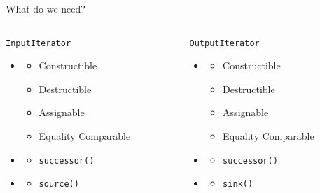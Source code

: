 \documentclass[aspectratio=169]{beamer}
\begin{document}

\begin{frame}{What do we need?}
  \begin{columns}
    \begin{column}{0.5\textwidth}
      \centerline{\texttt{InputIterator}}
      \begin{itemize}
      \item[] 
        \begin{itemize}
        \item Constructible
        \item Destructible
        \item Assignable
        \item Equality Comparable
        \end{itemize}
      \item[] 
        \begin{itemize}
        \item \texttt{successor()}
        \end{itemize}
      \item[] 
        \begin{itemize}
        \item \texttt{source()}
        \end{itemize}
      \end{itemize}
    \end{column}

    \begin{column}{0.5\textwidth}
      \centerline{\texttt{OutputIterator}}
      \begin{itemize}
      \item[] 
        \begin{itemize}
        \item Constructible
        \item Destructible
        \item Assignable
        \item Equality Comparable
        \end{itemize}
      \item[] 
        \begin{itemize}
        \item \texttt{successor()}
        \end{itemize}
      \item[] 
        \begin{itemize}
        \item \texttt{sink()}
        \end{itemize}
      \end{itemize}
    \end{column}
  \end{columns}
\end{frame}
\end{document}

